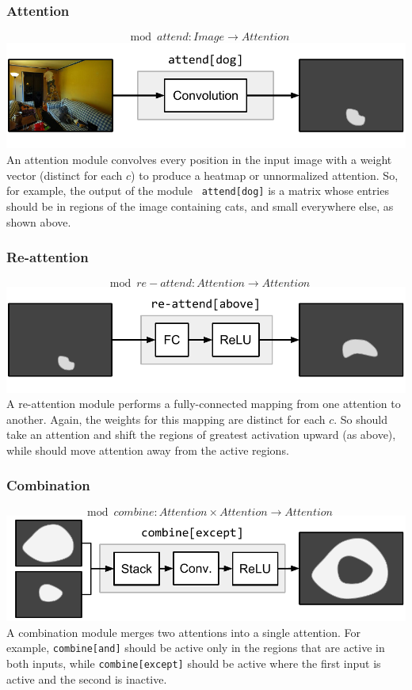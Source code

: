 \subsubsection*{Attention}
\[
  \mod{attend} : \mathit{Image} \to \mathit{Attention}
\]
\includegraphics[width=\columnwidth]{fig/attend}
An attention module  convolves every position in the input
image with a weight vector (distinct for each $c$) to produce a heatmap or
unnormalized attention. So, for example, the output of the module {\small\tt
attend[dog]} is a matrix whose entries should be in regions of the image
containing cats, and small everywhere else, as shown above.\\

\subsubsection*{Re-attention}
\[
  \mod{re-attend} : \mathit{Attention} \to \mathit{Attention}
\]
\includegraphics[width=\columnwidth]{fig/re-attend}
A re-attention module  performs a fully-connected mapping
from one attention to another. Again, the weights for this mapping are distinct
for each $c$. So  should take an attention and shift the
regions of greatest activation upward (as above), while 
should move attention away from the active regions.\\%

\subsubsection*{Combination}
\[
  \mod{combine} : \mathit{Attention} \times \mathit{Attention} \to
  \mathit{Attention}
\]
\includegraphics[width=\columnwidth]{fig/combine}
A combination module  merges two attentions into a single
attention. For example, {\small\tt combine[and]} should be active only in the
regions that are active in both inputs, while {\small\tt{combine[except]}}
should be active where the first input is active and the second is
inactive.\\[1em] 

